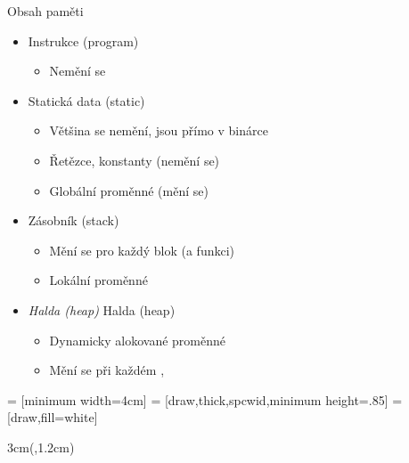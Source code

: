 
\begin{frame}{Obsah paměti}

  \begin{itemize}
    \item Instrukce (program)
    \begin{itemize}
      \item Nemění se
    \end{itemize}

    \pause

    \item Statická data (static)
    \begin{itemize}
      \item Většina se nemění, jsou přímo v binárce
      \item Řetězce, konstanty (nemění se)
      \item Globální proměnné (mění se)
    \end{itemize}

    \pause

    \item Zásobník (stack)
    \begin{itemize}
      \item Mění se pro každý blok (a funkci)
      \item Lokální proměnné
    \end{itemize}

    \pause

    \item \ifheapemph \emph{Halda (heap)} \else Halda (heap) \fi
    \begin{itemize}
      \item Dynamicky alokované proměnné
      \item Mění se při každém , 
    \end{itemize}

  \end{itemize}

   = [minimum width=4cm]
   = [draw,thick,spcwid,minimum height=.85\textheight]
   = [draw,fill=white]

  \begin{textblock*}{3cm}(\textwidth-3.5cm,1.2cm)
\end{textblock*}
\end{frame}
